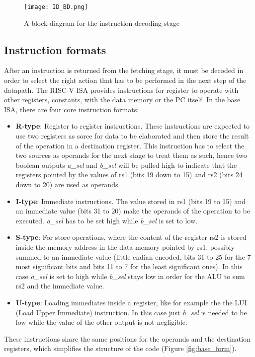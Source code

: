 \begin{figure}[ht!]
  \centering
  \texttt{[image: ID\_BD.png]}
  \caption{A block diagram for the instruction decoding stage}
  \label{fig:ID_BD}
\end{figure}

\subsection{Instruction formats}
After an instruction is returned from the fetching stage, it must be decoded in order to select the right action that has to be performed in the next step of the datapath. The RISC-V ISA provides instructions for register to operate with other registers, constants, with the data memory or the PC itself.
In the base ISA, there are four core instruction formats:
\begin{itemize}
\item \textbf{R-type}: Register to register instructions. These instructions are expected to use two registers as sorce for data to be elaborated and then store the result of the operation in a destination register. This instruction has to select the two sources as operands for the next stage to treat them as such, hence two boolean outputs \emph{a\_sel} and \emph{b\_sel} will be pulled high to indicate that the registers pointed by the values of rs1 (bits 19 down to 15) and rs2 (bits 24 down to 20) are used as operands.
\item \textbf{I-type}: Immediate instructions. The value stored in rs1 (bits 19 to 15) and an immediate value (bits 31 to 20) make the operands of the operation to be executed. \emph{a\_sel} has to be set high while \emph{b\_sel} is set to low.
\item \textbf{S-type}: For store operations, where the content of the register rs2 is stored inside the memory address in the data memory pointed by rs1, possibly summed to an immediate value (little endian encoded, bits 31 to 25 for the 7 most significant bits and bits 11 to 7 for the least significant ones). In this case \emph{a\_sel} is set to high while \emph{b\_sel} stays low in order for the ALU to sum rs2 and the immediate value.
\item \textbf{U-type}: Loading immediates inside a register, like for example the the LUI (Load Upper Immediate) instruction. In this case just \emph{b\_sel} is needed to be low while the value of the other output is not negligible.
\end{itemize}
These instructions share the same positions for the operands and the destination registers, which simplifies the structure of the code (Figure \ref{fig:base_form}).
